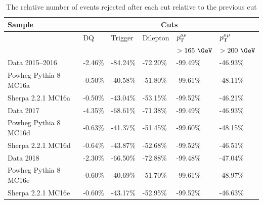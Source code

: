 \begin{table}[h!]
  \centering
  \begin{tabular}{l|l|l|l|l|l}
  \hline\hline
  \textbf{Sample} & \multicolumn{5}{c}{\textbf{Cuts}} \\ \hline
    & DQ & Trigger & Dilepton & $p_\mathrm{T}^{\mu\mu}$ & $p_\mathrm{T}^{\mu\mu}$ \\
    &  &  &  & $>165~\GeV$ & $>200~\GeV$ \\ \hline\hline
   Data 2015--2016 & -2.46\% & -84.24\% & -72.20\% & -99.49\% & -46.93\% \\ \hline
   Powheg Pythia 8 MC16a & -0.50\% & -40.58\% & -51.80\% & -99.61\% & -48.11\% \\ \hline
   Sherpa 2.2.1 MC16a & -0.50\% & -43.04\% & -53.15\% & -99.52\% & -46.21\% \\ \hline\hline
   Data 2017 & -4.35\% & -68.61\% & -71.38\% & -99.49\% & -46.93\% \\ \hline
   Powheg Pythia 8 MC16d & -0.63\% & -41.37\% & -51.45\% & -99.60\% & -48.15\% \\ \hline
   Sherpa 2.2.1 MC16d & -0.64\% & -43.87\% & -52.68\% & -99.52\% & -46.51\% \\ \hline\hline
   Data 2018 & -2.30\% & -66.50\% & -72.88\% & -99.48\% & -47.04\% \\ \hline
   Powheg Pythia 8 MC16e & -0.60\% & -40.69\% & -51.70\% & -99.61\% & -48.97\% \\ \hline
   Sherpa 2.2.1 MC16e & -0.60\% & -43.17\% & -52.95\% & -99.52\% & -46.63\% \\ \hline\hline
   \end{tabular}
   \caption{The relative number of events rejected after each cut relative to the previous cut}
   \label{tab:RelCF}
\end{table}

